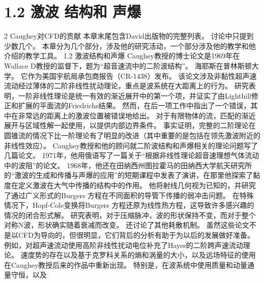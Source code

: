 \documentclass[UTF8,11pt,a4paper,openany,fontset=fandol]{ctexbook}
\begin{document}
\section{1.2 激波 结构和 声爆}
2 Caughey对CFD的贡献 本章末尾包含David出版物的完整列表。 讨论中只提到少数几个。 本章分为几个部分，涉及他的研究活动，一个部分涉及他的教学和他介绍的教学工具。 1.2 激波结构和声爆 Caughey教授的博士论文是1969年在Wallace D教授的监督下，题为“超音速流中的二阶波结构”。 海耶斯在普林斯顿大学。 它作为美国宇航局承包商报告（CR-1438）发布。 该论文涉及非黏性超声速流动经过薄体的二阶非线性扰动理论，重点是波系统在大距离上的行为。 研究表明，一阶非线性理论是统一有效的渐近展开中的第一个项，并证实了由Lighthill修正和扩展的平面流的Friedrichs结果。 然而，在后一项工作中指出了一个错误，其中在非常远的距离上的激波位置被错误地给出。 对于有限物体的流，匹配的渐近展开与区域性解一起使用，以提供内部边界条件。 事实证明，完整的二阶理论在圆锥流的情况下比一阶理论有了明显的改进（其中重要的是包括在领先激波附近的非线性效应）。 Caughey教授和他的顾问就二阶波结构和声爆相关的理论问题写了几篇论文。 1971年，他用俄语写了一篇关于“根据非线性理论超音速理想气体流动中的波阻”的论文。 1968年，他还在田纳西州图拉霍马的田纳西大学航天研究所的“激波的生成和传播与声爆的应用”的短期课程中发表了演讲，在那里他探索了黏度在定义激波在大气中传播的结构中的作用。 他将射线几何视为已知的，并研究了通过广义形式的Burgers 方程在不同面积的导管下传播的弱冲击问题。 在特殊情况下，Hopf-Cole变换将Burgers 方程还原为线性热方程，这导致许多感兴趣的情况的闭合形式解。 研究表明，对于压缩脉冲，波的形状保持不变，而对于整个对称N波，形状确实随着衰减而改变。 还讨论了其他耗散机制。 虽然这些论文不是以CFD为导向的，但很明显，它们背后的分析有助于为以后的发展做好准备。 例如，对超声速流动使用高阶非线性扰动电位补充了Hayes的二阶跨声速流动理论。 速度势的存在以及基于克罗科关系的熵和涡量的大小，以及远场特征的使用在Caughey教授后来的作品中重新出现。 特别是，在波系统中使用质量和动量通量守恒，以及
\end{document}
